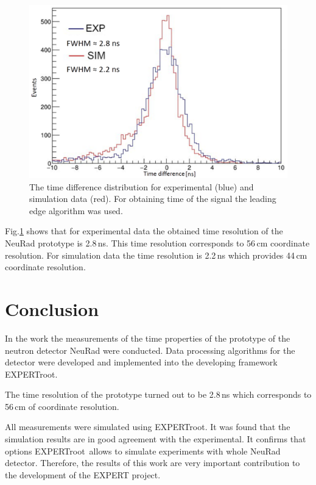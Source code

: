 \documentclass{webofc}
\newcommand{\er}{\textmd{EXPERTroot}}
\begin{document}
\begin{figure}[h]
	\centering
	\includegraphics[width=0.8\linewidth]{tausim.png}
	\caption{The time difference distribution for experimental (blue) and simulation data (red). For obtaining time of the signal the leading edge algorithm was used.}\label{ris:tausim}
\end{figure}

Fig.\ref{ris:tausim} shows that for experimental data the obtained time resolution of the NeuRad prototype is 2.8\,ns. This time resolution corresponds to 56\,cm coordinate resolution. For simulation data the time resolution is 2.2\,ns which provides 44\,cm coordinate resolution.  



\section{Conclusion}
In the work the measurements of the time properties of the prototype of the neutron detector NeuRad were conducted.
Data processing algorithms for the detector were developed and implemented into the developing framework \er.

The time resolution of the prototype turned out to be 2.8\,ns which corresponds to 56\,cm of coordinate resolution.

All measurements were simulated using \er. It was found that the simulation results are in good agreement with the experimental. It confirms that options \er\, allows to simulate experiments with whole NeuRad detector.
Therefore, the results of this work are very important contribution to the development of the EXPERT project.
\end{document}
